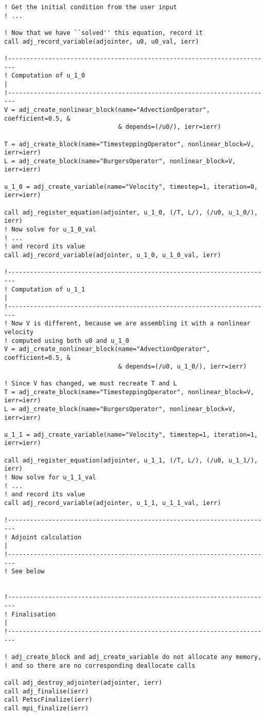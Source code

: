 \documentclass[10pt,authoryear]{elsarticle}
\begin{document}
\begin{verbatim}
! Get the initial condition from the user input
! ...

! Now that we have ``solved'' this equation, record it
call adj_record_variable(adjointer, u0, u0_val, ierr)

!------------------------------------------------------------------------
! Computation of u_1_0                                                  |
!------------------------------------------------------------------------
V = adj_create_nonlinear_block(name="AdvectionOperator", coefficient=0.5, &
                               & depends=(/u0/), ierr=ierr) 

T = adj_create_block(name="TimesteppingOperator", nonlinear_block=V, ierr=ierr)
L = adj_create_block(name="BurgersOperator", nonlinear_block=V, ierr=ierr)

u_1_0 = adj_create_variable(name="Velocity", timestep=1, iteration=0, ierr=ierr)

call adj_register_equation(adjointer, u_1_0, (/T, L/), (/u0, u_1_0/), ierr)
! Now solve for u_1_0_val
! ...
! and record its value
call adj_record_variable(adjointer, u_1_0, u_1_0_val, ierr)

!------------------------------------------------------------------------
! Computation of u_1_1                                                  |
!------------------------------------------------------------------------
! Now V is different, because we are assembling it with a nonlinear velocity
! computed using both u0 and u_1_0
V = adj_create_nonlinear_block(name="AdvectionOperator", coefficient=0.5, &
                               & depends=(/u0, u_1_0/), ierr=ierr) 

! Since V has changed, we must recreate T and L
T = adj_create_block(name="TimesteppingOperator", nonlinear_block=V, ierr=ierr)
L = adj_create_block(name="BurgersOperator", nonlinear_block=V, ierr=ierr)

u_1_1 = adj_create_variable(name="Velocity", timestep=1, iteration=1, ierr=ierr)

call adj_register_equation(adjointer, u_1_1, (/T, L/), (/u0, u_1_1/), ierr)
! Now solve for u_1_1_val
! ...
! and record its value
call adj_record_variable(adjointer, u_1_1, u_1_1_val, ierr)

!------------------------------------------------------------------------
! Adjoint calculation                                                   |
!------------------------------------------------------------------------
! See below


!------------------------------------------------------------------------
! Finalisation                                                          |
!------------------------------------------------------------------------

! adj_create_block and adj_create_variable do not allocate any memory,
! and so there are no corresponding deallocate calls

call adj_destroy_adjointer(adjointer, ierr)
call adj_finalise(ierr)
call PetscFinalize(ierr)
call mpi_finalize(ierr)
\end{verbatim}
\end{document}
